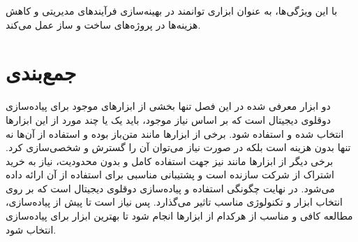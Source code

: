 با این ویژگی‌ها،  به عنوان ابزاری توانمند در بهینه‌سازی فرآیندهای مدیریتی و کاهش هزینه‌ها در پروژه‌های ساخت و ساز عمل می‌کند.

\section{جمع‌بندی}
دو ابزار معرفی شده در این فصل تنها بخشی از ابزار‌های موجود برای پیاده‌سازی دوقلوی دیجیتال است که بر اساس نیاز موجود، باید یک یا چند مورد از این ابزار‌ها انتخاب شده و استفاده شود. برخی از ابزار‌ها مانند  متن‌باز بوده و استفاده از آن‌ها نه تنها بدون هزینه است بلکه در صورت نیاز می‌توان آن را گسترش و شخصی‌سازی کرد. برخی دیگر از ابزار‌ها مانند  نیز جهت استفاده کامل و بدون محدودیت، نیاز به خرید اشتراک از شرکت سازنده است و پشتیبانی مناسبی برای استفاده از آن ارائه داده می‌شود. در نهایت چگونگی استفاده و پیاده‌سازی دوقلوی دیجیتال است که بر روی انتخاب ابزار و تکنولوژی مناسب تاثیر می‌گذارد. پس نیاز است تا پیش از پیاده‌سازی، مطالعه کافی و مناسب از هرکدام از ابزار‌ها انجام شود تا بهترین ابزار‌ برای پیاده‌سازی انتخاب شود.








